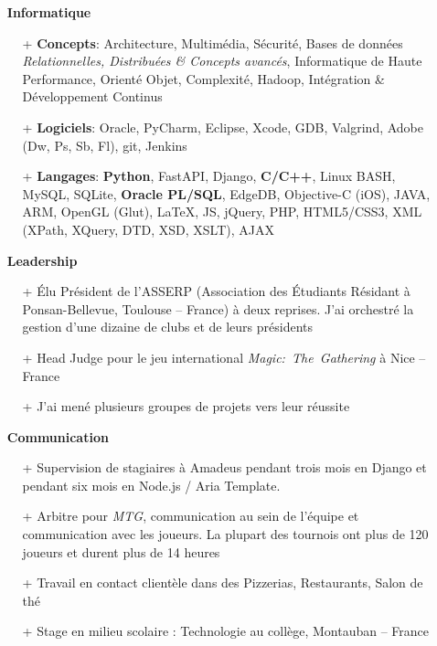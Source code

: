 \documentclass{res}
\begin{document}
\begin{resume}
	\begin{itemize}
	\item[] \faLaptopCode~\textbf{Informatique}
		\begin{itemize}
                  \item[+] \textbf{Concepts}: Architecture, Multim\'edia, S\'ecurit\'e, Bases de donn\'ees \textit{Relationnelles, Distribu\'ees \& Concepts avanc\'es}, Informatique de Haute Performance, Orient\'e Objet, Complexit\'e, Hadoop, Int\'egration \& D\'eveloppement Continus
                  \item[+] \textbf{Logiciels}: Oracle, PyCharm, Eclipse, Xcode, GDB, Valgrind, Adobe (Dw, Ps, Sb, Fl), git, Jenkins
                  \item[+] \textbf{Langages}: \textbf{Python}, FastAPI, Django, \textbf{C/C++}, Linux BASH, MySQL, SQLite, \textbf{Oracle PL/SQL}, EdgeDB, Objective-C (iOS), JAVA, ARM, OpenGL (Glut), \LaTeX{}, JS, jQuery, PHP, HTML5/CSS3, XML (XPath, XQuery, DTD, XSD, XSLT), AJAX
		\end{itemize}    
	\end{itemize}

	\begin{itemize}
	\item[] \faHandshake[regular]~\textbf{Leadership}
		\begin{itemize}
                   \item[+] \'Elu Pr\'esident de l'ASSERP (Association des \'Etudiants R\'esidant \`a Ponsan-Bellevue, Toulouse -- France) \`a deux reprises. J'ai orchestr\'e la gestion d'une dizaine de clubs et de leurs pr\'esidents
                  \item[+] Head Judge pour le jeu international \textit{Magic:~The~Gathering} \`a Nice -- France
                  \item[+] J'ai men\'e plusieurs groupes de projets vers leur r\'eussite
		\end{itemize}   
	\end{itemize}
	
	\begin{itemize}
	\item[] \faComments[regular]~\textbf{Communication}
		\begin{itemize}
									\item[+] Supervision de stagiaires \`a Amadeus pendant trois mois en Django et pendant six mois en Node.js / Aria Template.
                  \item[+] Arbitre pour \textit{MTG}, communication au sein de l'\'equipe et communication avec les joueurs. La plupart des tournois ont plus de 120 joueurs et durent plus de 14 heures
                  \item[+] Travail en contact client\`ele dans des Pizzerias, Restaurants, Salon de th\'e
                  \item[+] Stage en milieu scolaire : Technologie au coll\`ege, Montauban -- France


\end{itemize}
\end{itemize}
\end{resume}
\end{document}
